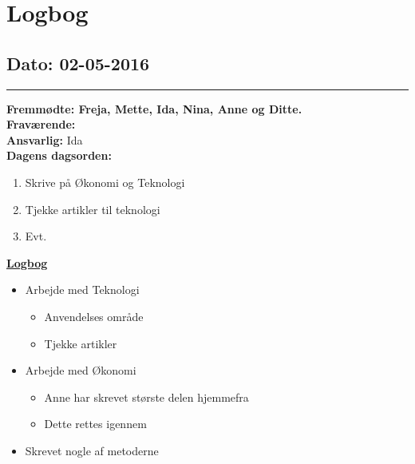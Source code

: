 \chapter{Logbog}
\section{Dato: 02-05-2016}
\hrule
\textbf{Fremmødte: Freja, Mette, Ida, Nina, Anne og Ditte.} \\
\textbf{Fraværende: } \\
\textbf{Ansvarlig: } Ida \\
\textbf{Dagens dagsorden: }
\begin{enumerate}
	\item Skrive på Økonomi og Teknologi
	\item Tjekke artikler til teknologi
	\item Evt. 
\end{enumerate}


\underline{\textbf{Logbog}}
\begin{itemize}
\item Arbejde med Teknologi
\begin{itemize}
\item Anvendelses område
\item Tjekke artikler
\end{itemize}
\item Arbejde med Økonomi
\begin{itemize}
\item Anne har skrevet største delen hjemmefra
\item Dette rettes igennem
\end{itemize}
\item Skrevet nogle af metoderne
\end{itemize}
